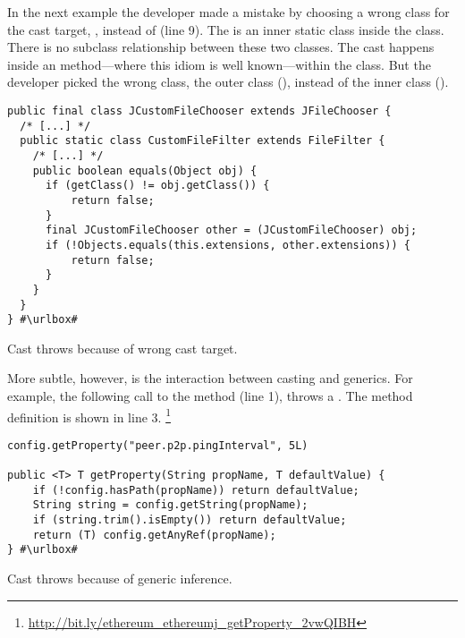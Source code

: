 In the next example the developer made a mistake by choosing a wrong class for the cast target,
\ie,  instead of  (line 9).
The  is an inner static class inside the  class.
There is no subclass relationship between these two classes.
The cast happens inside an  method---where this idiom is well known---within the  class.
But the developer picked the wrong class, the outer class (), instead of the inner class ().

\def\urlvar{http://bit.ly/GoldenGnu_jeveassets_2vsLbMr}
\begin{listing}
\begin{verbatim}
public final class JCustomFileChooser extends JFileChooser {
  /* [...] */
  public static class CustomFileFilter extends FileFilter {
    /* [...] */
    public boolean equals(Object obj) {
      if (getClass() != obj.getClass()) {
          return false;
      }
      final JCustomFileChooser other = (JCustomFileChooser) obj;
      if (!Objects.equals(this.extensions, other.extensions)) {
          return false;
      }
    }
  }
} #\urlbox#
\end{verbatim} 
\caption{Cast throws  because of wrong cast target.}
\end{listing}

More subtle, however, is the interaction between casting and generics.
For example, the following call to the  method (line 1),%
throws a .
The method definition is shown in line 3.%
\footnote{\url{http://bit.ly/ethereum_ethereumj_getProperty_2vwQIBH}}

\def\urlvar{http://bit.ly/ethereum_ethereumj_2vw4If8}
\begin{listing}
\begin{verbatim}
config.getProperty("peer.p2p.pingInterval", 5L)

public <T> T getProperty(String propName, T defaultValue) {
    if (!config.hasPath(propName)) return defaultValue;
    String string = config.getString(propName);
    if (string.trim().isEmpty()) return defaultValue;
    return (T) config.getAnyRef(propName);
} #\urlbox#
\end{verbatim}
\caption{Cast throws  because of generic inference.}
\end{listing}

